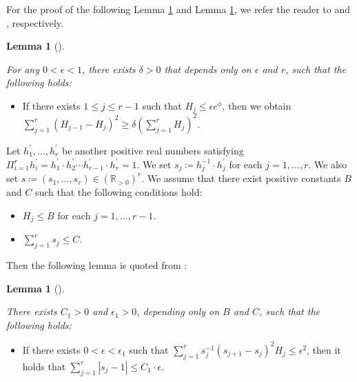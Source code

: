 \documentclass[12pt]{article}
\theoremstyle{definition}
\newtheorem{lemm}[defi]{Lemma}
\def\R{{\mathbb R}}
\begin{document}
For the proof of the following Lemma \ref{lem3} and Lemma \ref{lem4}, we refer the reader to \cite[Proposition 3.8]{LM1} and \cite[Lemma 3.10]{LM1}, respectively.
\begin{lemm}[\cite{LM1}]\label{lem3}{\it For any $0<\epsilon<1$, there exists $\delta>0$ that depends only on $\epsilon$ and $r$, such that the following holds:
\begin{itemize}
\item If there exists $1\leq j\leq r-1$ such that $H_j\leq \epsilon e^\phi$, then we obtain $\sum_{j=1}^r(H_{j-1}-H_j)^2\geq \delta (\sum_{j=1}^r H_j)^2$.
\end{itemize}
}
\end{lemm}
Let $h_1^\prime,\dots, h_r^\prime$ be another positive real numbers satisfying $\Pi_{i=1}^rh_i^\prime=h_1^\prime\cdot h_2^\prime\cdots h_{r-1}^\prime\cdot h_r^\prime=1$. We set $s_j\coloneqq h_j^{-1}\cdot h_j^\prime$ for each $j=1,\dots, r$. We also set $s\coloneqq (s_1,\dots, s_r)\in (\R_{>0})^r$. We assume that there exist positive constants $B$ and $C$ such that the following conditions hold:
\begin{itemize}
\item $H_j\leq B$ for each $j=1,\dots, r-1$.
\item $\sum_{j=1}^rs_j\leq C$.
\end{itemize}
Then the following lemma is quoted from \cite[Lemma 3.10]{LM1}:
\begin{lemm}[\cite{LM1}]\label{lem4}{\it There exists $C_1>0$ and $\epsilon_1>0$, depending only on $B$ and $C$, such that the following holds:
\begin{itemize}
\item If there exists $0<\epsilon<\epsilon_1$ such that $\sum_{j=1}^rs_j^{-1}(s_{j+1}-s_j)^2H_j \leq \epsilon^2$, then it holds that $\sum_{j=1}^r|s_j-1|\leq C_1\cdot \epsilon$.
\end{itemize}
}
\end{lemm}
\end{document}
